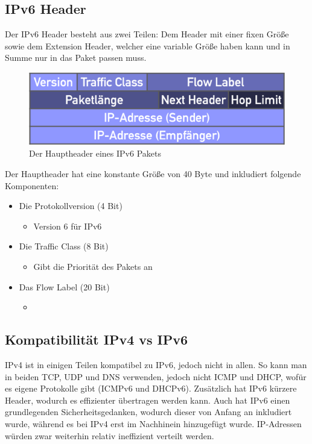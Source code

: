 \documentclass{article}
\begin{document}
	  \subsection{IPv6 Header}
	  Der IPv6 Header besteht aus zwei Teilen: Dem Header mit einer fixen Größe sowie dem Extension Header, welcher eine variable Größe haben kann und in Summe nur in das Paket passen muss. 
	  \begin{figure}[H]
	  \centering
	  \includegraphics[scale=0.4]{Bilder/IPv6.png}
	  \caption{Der Hauptheader eines IPv6 Pakets}
	  \end{figure}
	  Der Hauptheader hat eine konstante Größe von 40 Byte und inkludiert folgende Komponenten:
	  \begin{itemize}
	  	\item{Die Protokollversion (4 Bit)}
	  	\begin{itemize}
	  		\item{Version 6 für IPv6}
	  	\end{itemize}
	  	\item{Die Traffic Class (8 Bit)}
	  	\begin{itemize}
	  		\item{Gibt die Priorität des Pakets an}
	  	\end{itemize}
	  	\item{Das Flow Label (20 Bit)}
	  	\begin{itemize}
	  		\item{}
	  	\end{itemize}
	  \end{itemize}

	  \subsection{Kompatibilität IPv4 vs IPv6}
	  IPv4 ist in einigen Teilen kompatibel zu IPv6, jedoch nicht in allen. So kann man in beiden TCP, UDP und DNS verwenden, jedoch nicht ICMP und DHCP, wofür es eigene Protokolle gibt (ICMPv6 und DHCPv6). Zusätzlich hat IPv6 kürzere Header, wodurch es effizienter übertragen werden kann. Auch hat IPv6 einen grundlegenden Sicherheitsgedanken, wodurch dieser von Anfang an inkludiert wurde, während es bei IPv4 erst im Nachhinein hinzugefügt wurde. IP-Adressen würden zwar weiterhin relativ ineffizient verteilt werden. \\
\end{document}
